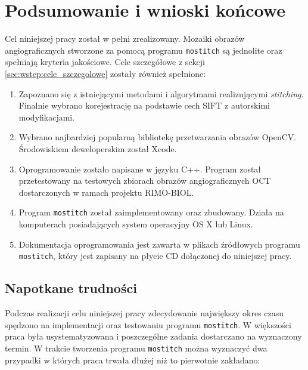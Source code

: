 %
\chapter{Podsumowanie i wnioski końcowe}
\label{sec:podsumowanie_i_wnioski}

Cel niniejszej pracy został w pełni zrealizowany. Mozaiki obrazów angiograficznych stworzone za pomocą programu \texttt{mostitch} są jednolite oraz spełniają kryteria jakościowe. Cele szczegółowe z sekcji \ref{sec:wstep:cele_szczegolowe} zostały również spełnione:

\begin{enumerate}
\item Zapoznano się z istniejącymi metodami i algorytmami realizującymi \textit{stitching}. Finalnie wybrano korejestrację na podstawie cech SIFT z autorskimi modyfikacjami.
\item Wybrano najbardziej popularną bibliotekę przetwarzania obrazów OpenCV. Środowiskiem deweloperskim został Xcode.
\item Oprogramowanie zostało napisane w języku C++. Program został przetestowany na testowych zbiorach obrazów angiograficznych OCT dostarczonych w ramach projektu RIMO-BIOL.
\item Program \texttt{mostitch} został zaimplementowany oraz zbudowany. Działa na komputerach posiadających system operacyjny OS X lub Linux.
\item Dokumentacja oprogramowania jest zawarta w plikach źródłowych programu \texttt{mostitch}, który jest zapisany na płycie CD dołączonej do niniejszej pracy.
\end{enumerate}

\section{Napotkane trudności}
\label{sec:podsumowanie_i_wnioski:napotkane_trudnosci}

Podczas realizacji celu niniejszej pracy zdecydowanie największy okres czasu spędzono na implementacji oraz testowaniu programu \texttt{mostitch}. W większości praca była usystematyzowana i poszczególne zadania dostarczano na wyznaczony termin. W trakcie tworzenia programu \texttt{mostitch} można wyznaczyć dwa przypadki w których praca trwała dłużej niż to pierwotnie zakładano:

